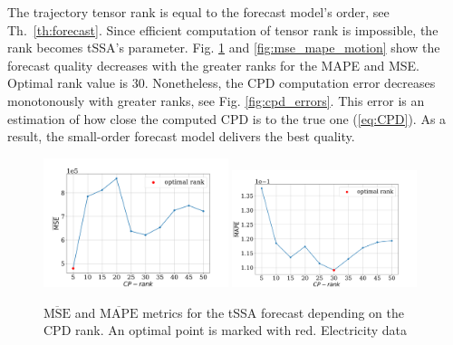 \documentclass[referee, pdflatex, sn-mathphys-num]{sn-jnl}
\theoremstyle{definition}
\theoremstyle{plain}
\begin{document}
	The trajectory tensor rank is equal to the forecast model's order, see Th.~\ref{th:forecast}. Since efficient computation of tensor rank is impossible, the rank becomes tSSA's parameter. Fig. \ref{fig:mse_mape_electr} and \ref{fig:mse_mape_motion} show the forecast quality decreases with the greater ranks for the MAPE and MSE. Optimal rank value is 30. Nonetheless, the CPD computation error decreases monotonously with greater ranks, see Fig. \ref{fig:cpd_errors}. This error is an estimation of how close the computed CPD is to the true one (\ref{eq:CPD}). As a result, the small-order forecast model delivers the best quality. 

	\begin{figure}[h]
		\centering
		\includegraphics[width=0.48\textwidth, keepaspectratio]{pred_MSE_rank_elec.png}
		\includegraphics[width=0.48\textwidth, keepaspectratio]{pred_MAPE_rank_elec.png}
		\caption{$ \overline{\text{MSE}} $ and $ \overline{\text{MAPE}} $ metrics for the tSSA forecast depending on the CPD rank. An optimal point is marked with red. Electricity data}\label{fig:mse_mape_electr}
	\end{figure}
	
\end{document}
